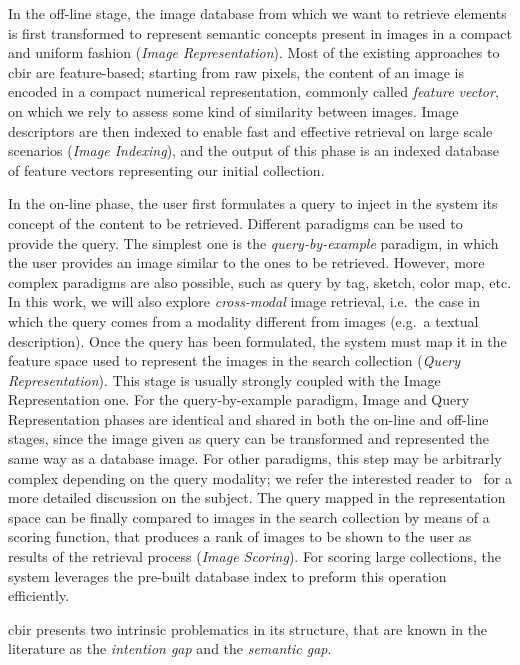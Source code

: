In the off-line stage, the image database from which we want to retrieve elements is first transformed to represent semantic concepts present in images in a compact and uniform fashion (\emph{Image Representation}).
Most of the existing approaches to \gls{cbir} are feature-based;
starting from raw pixels, the content of an image is encoded in a compact numerical representation, commonly called \emph{feature vector}, on which we rely to assess some kind of similarity between images.
Image descriptors are then indexed to enable fast and effective retrieval on large scale scenarios (\emph{Image Indexing}), and the output of this phase is an indexed database of feature vectors representing our initial collection.

In the on-line phase, the user first formulates a query to inject in the system its concept of the content to be retrieved.
Different paradigms can be used to provide the query.
The simplest one is the \emph{query-by-example} paradigm, in which the user provides an image similar to the ones to be retrieved.
However, more complex paradigms are also possible, such as query by tag, sketch, color map, etc.
In this work, we will also explore \emph{cross-modal} image retrieval, i.e.\  the case in which the query comes from a modality different from images (e.g.\ a textual description).
Once the query has been formulated, the system must map it in the feature space used to represent the images in the search collection (\emph{Query Representation}).
This stage is usually strongly coupled with the Image Representation one.
For the query-by-example paradigm, Image and Query Representation phases are identical and shared in both the on-line and off-line stages, since the image given as query can be transformed and represented the same way as a database image.
For other paradigms, this step may be arbitrarly complex depending on the query modality;
we refer the interested reader to~\cite{zhou2017recent} for a more detailed discussion on the subject.
The query mapped in the representation space can be finally compared to images in the search collection by means of a scoring function, that produces a rank of images to be shown to the user as results of the retrieval process (\emph{Image Scoring}).
For scoring large collections, the system leverages the pre-built database index to preform this operation efficiently.

\acrlong{cbir} presents two intrinsic problematics in its structure, that are known in the literature as the \emph{intention gap} and the \emph{semantic gap}.

